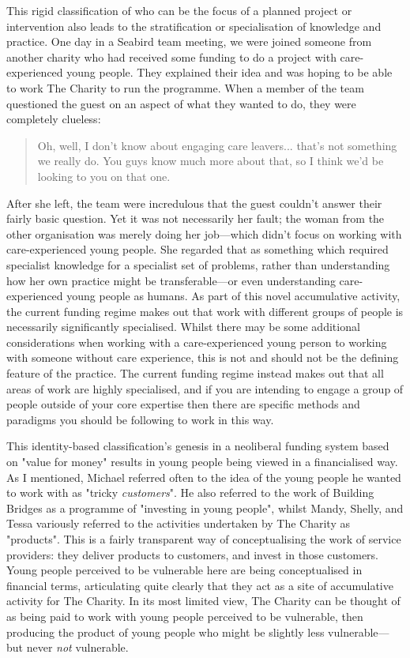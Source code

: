 This rigid classification of who can be the focus of a planned project or intervention also leads to the stratification or specialisation of knowledge and practice. One day in a Seabird team meeting, we were joined someone from another charity who had received some funding to do a project with care-experienced young people. They explained their idea and was hoping to be able to work The Charity to run the programme. When a member of the team questioned the guest on an aspect of what they wanted to do, they were completely clueless:
\begin{quote}
Oh, well, I don't know about engaging care leavers... that's not something we really do. You guys know much more about that, so I think we'd be looking to you on that one.
\end{quote}
After she left, the team were  incredulous that the guest couldn't answer their fairly basic question. Yet it was not necessarily her fault; the woman from the other organisation was merely doing her job—which didn't focus on working with care-experienced young people. She regarded that as something which required specialist knowledge for a specialist set of problems, rather than understanding how her own practice might be transferable—or even understanding care-experienced young people as humans. As part of this novel accumulative activity, the current funding regime makes out that work with different groups of people is necessarily significantly specialised. Whilst there may be some additional considerations when working with a care-experienced young person to working with someone without care experience, this is not and should not be the defining feature of the practice. The current funding regime instead makes out that all areas of work are highly specialised, and if you are intending to engage a group of people outside of your core expertise then there are specific methods and paradigms you should be following to work in this way. 

This identity-based classification's genesis in a neoliberal funding system based on "value for money" results in young people being viewed in a financialised way. As I mentioned, Michael referred often to the idea of the young people he wanted to work with as "tricky \emph{customers}". He also referred to the work of Building Bridges as a programme of "investing in young people", whilst Mandy, Shelly, and Tessa variously referred to the activities undertaken by The Charity as "products". This is a fairly transparent way of conceptualising the work of service providers: they deliver products to customers, and invest in those customers. Young people perceived to be vulnerable here are being conceptualised in financial terms, articulating quite clearly that they act as a site of accumulative activity for The Charity. In its most limited view, The Charity can be thought of as being paid to work with young people perceived to be vulnerable, then producing the product of young people who might be slightly less vulnerable—but never \textit{not} vulnerable.

